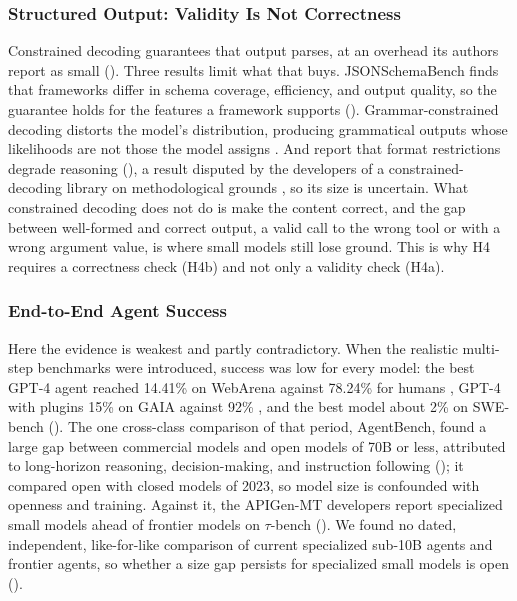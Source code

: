 \subsubsection{Structured Output: Validity Is Not Correctness}
\label{subsubsec:agentic_ev_struct}

Constrained decoding guarantees that output parses, at an overhead its authors report as small \citep{willard2023guided,dong2024xgrammar} (\evC). Three results limit what that buys. JSONSchemaBench finds that frameworks differ in schema coverage, efficiency, and output quality, so the guarantee holds for the features a framework supports \citep{geng2025jsonschemabench} (\evB). Grammar-constrained decoding distorts the model's distribution, producing grammatical outputs whose likelihoods are not those the model assigns \citep{park2024gad}. And \citet{tam2024speakfreely} report that format restrictions degrade reasoning (\evB), a result disputed by the developers of a constrained-decoding library on methodological grounds \citep{kurt2024saywhatyoumean}, so its size is uncertain. What constrained decoding does not do is make the content correct, and the gap between well-formed and correct output, a valid call to the wrong tool or with a wrong argument value, is where small models still lose ground. This is why H4 requires a correctness check (H4b) and not only a validity check (H4a).

\subsubsection{End-to-End Agent Success}
\label{subsubsec:agentic_ev_e2e}

Here the evidence is weakest and partly contradictory. When the realistic multi-step benchmarks were introduced, success was low for every model: the best GPT-4 agent reached 14.41\% on WebArena against 78.24\% for humans \citep{zhou2024webarena}, GPT-4 with plugins 15\% on GAIA against 92\% \citep{mialon2024gaia}, and the best model about 2\% on SWE-bench \citep{jimenez2024swebench} (\evB). The one cross-class comparison of that period, AgentBench, found a large gap between commercial models and open models of 70B or less, attributed to long-horizon reasoning, decision-making, and instruction following \citep{liu2024agentbench} (\evB); it compared open with closed models of 2023, so model size is confounded with openness and training. Against it, the APIGen-MT developers report specialized small models ahead of frontier models on $\tau$-bench \citep{prabhakar2025apigenmt} (\evC). We found no dated, independent, like-for-like comparison of current specialized sub-10B agents and frontier agents, so whether a size gap persists for specialized small models is open (\evD).

